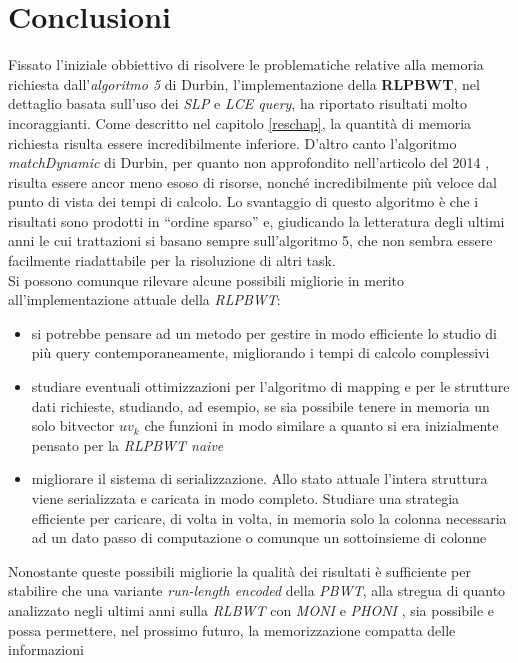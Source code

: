 \documentclass[a4paper,12pt, oneside, draft]{book}
\begin{document}
\chapter{Conclusioni}
\label{conchap}
Fissato l'iniziale obbiettivo di risolvere le problematiche relative alla
memoria richiesta dall'\textit{algoritmo 5} di Durbin, l'implementazione della
\textbf{RLPBWT}, nel dettaglio basata sull'uso dei \textit{SLP} e \textit{LCE
  query}, ha riportato risultati molto incoraggianti. Come descritto nel
capitolo \ref{reschap}, la quantità di memoria richiesta risulta essere
incredibilmente inferiore. D'altro canto l'algoritmo \textit{matchDynamic} di
Durbin, per quanto non approfondito nell'articolo del 2014 \cite{pbwt}, risulta
essere ancor meno esoso di risorse, nonché incredibilmente più veloce dal punto
di vista dei tempi di calcolo. Lo svantaggio di questo algoritmo è che i
risultati sono prodotti in ``ordine sparso'' e, giudicando la letteratura degli
ultimi anni le cui trattazioni si basano sempre sull'algoritmo 5, che non sembra
essere facilmente riadattabile per la risoluzione di altri task.\\
Si possono comunque rilevare alcune possibili migliorie in merito
all'implementazione attuale della \textit{RLPBWT}:
\begin{itemize}
  \item si potrebbe pensare ad un metodo per gestire in modo efficiente lo
  studio di più query contemporaneamente, migliorando i tempi di calcolo
  complessivi
  \item studiare eventuali ottimizzazioni per l'algoritmo di mapping e per le
  strutture dati richieste, studiando, ad esempio, se sia possibile tenere in
  memoria un solo bitvector $uv_k$ che funzioni in modo similare a quanto si era
  inizialmente pensato per la \textit{RLPBWT naive}
  \item migliorare il sistema di serializzazione. Allo stato attuale l'intera
  struttura viene serializzata e caricata in modo completo. Studiare una
  strategia efficiente per caricare, di volta in volta, in memoria solo la
  colonna necessaria ad un dato passo di computazione o comunque un sottoinsieme
  di colonne
\end{itemize}
Nonostante queste possibili migliorie la qualità dei risultati è sufficiente per
stabilire che una variante \textit{run-length encoded} della \textit{PBWT}, alla
stregua di quanto analizzato negli ultimi anni sulla \textit{RLBWT} con
\textit{MONI} \cite{moni} e \textit{PHONI} \cite{phoni}, sia possibile e possa
permettere, nel prossimo futuro, la memorizzazione compatta delle informazioni
\end{document}
